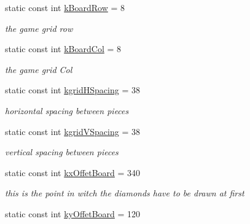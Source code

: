 \begin{DoxyCompactItemize}
\item 
\hypertarget{class_game_logic_a4e5991971dc3affa427858376f9174a4}{static const int \hyperlink{class_game_logic_a4e5991971dc3affa427858376f9174a4}{k\-Board\-Row} = 8}\label{class_game_logic_a4e5991971dc3affa427858376f9174a4}

\begin{DoxyCompactList}\small\item\em the game grid row \end{DoxyCompactList}\item 
\hypertarget{class_game_logic_a427fe7e0d0b8b87e65640ed8f8ea6da5}{static const int \hyperlink{class_game_logic_a427fe7e0d0b8b87e65640ed8f8ea6da5}{k\-Board\-Col} = 8}\label{class_game_logic_a427fe7e0d0b8b87e65640ed8f8ea6da5}

\begin{DoxyCompactList}\small\item\em the game grid Col \end{DoxyCompactList}\item 
\hypertarget{class_game_logic_a2fe8e94be59184e0d1e83a1e9818b950}{static const int \hyperlink{class_game_logic_a2fe8e94be59184e0d1e83a1e9818b950}{kgrid\-H\-Spacing} = 38}\label{class_game_logic_a2fe8e94be59184e0d1e83a1e9818b950}

\begin{DoxyCompactList}\small\item\em horizontal spacing between pieces \end{DoxyCompactList}\item 
\hypertarget{class_game_logic_ace636afc8c2e32f0f0965e6ecdbc8ded}{static const int \hyperlink{class_game_logic_ace636afc8c2e32f0f0965e6ecdbc8ded}{kgrid\-V\-Spacing} = 38}\label{class_game_logic_ace636afc8c2e32f0f0965e6ecdbc8ded}

\begin{DoxyCompactList}\small\item\em vertical spacing between pieces \end{DoxyCompactList}\item 
\hypertarget{class_game_logic_aa984d85731caea8b8715064ab7bf3b1c}{static const int \hyperlink{class_game_logic_aa984d85731caea8b8715064ab7bf3b1c}{kx\-Offet\-Board} = 340}\label{class_game_logic_aa984d85731caea8b8715064ab7bf3b1c}

\begin{DoxyCompactList}\small\item\em this is the point in witch the diamonds have to be drawn at first \end{DoxyCompactList}\item 
\hypertarget{class_game_logic_a445192abb3823d599b82bfcf3dfbb5d7}{static const int \hyperlink{class_game_logic_a445192abb3823d599b82bfcf3dfbb5d7}{ky\-Offet\-Board} = 120}\label{class_game_logic_a445192abb3823d599b82bfcf3dfbb5d7}


\end{DoxyCompactItemize}
